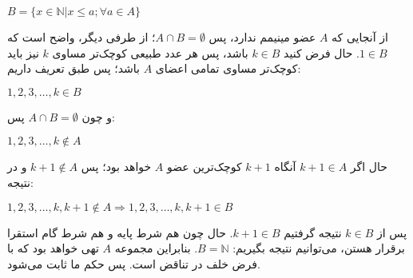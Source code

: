 \begin{PROBLEM}
{\begin{enumerate}
                \begin{flushleft}
                    $B = \{x \in \mathbb{N} | x \leq a; \forall a \in A\}$
                \end{flushleft}

                از آنجایی که
                $A$
                عضو مینیمم ندارد، پس
                $A \cap B = \emptyset$؛
                از طرفی دیگر، واضح است که
                $1 \in B$. 
                حال فرض کنید
                $k \in B$
                باشد، پس هر عدد طبیعی کوچک‌تر مساوی
                $k$
                نیز باید کوچک‌تر مساوی تمامی اعضای
                $A$
                باشد؛ پس طبق تعریف داریم:

                \begin{flushleft}
                    $1, 2, 3, \ldots, k \in B$
                \end{flushleft}

                و چون
                $A \cap B = \emptyset$    
                پس: 
                         
                \begin{flushleft}
                    $1, 2, 3, \ldots, k \notin A$
                \end{flushleft}

                حال اگر
                $k + 1 \in A$
                آنگاه
                $k + 1$
                کوچک‌ترین عضو
                $A$
                خواهد بود؛ پس
                $k + 1 \notin A$
                و در نتیجه:

                \begin{flushleft}
                    $1, 2, 3, \ldots, k, k + 1 \notin A \Rightarrow 1, 2, 3, \ldots, k, k + 1 \in B$
                \end{flushleft}

                پس از 
                $k \in B$
                نتیجه گرفتیم
                $k + 1 \in B$.
                حال چون هم شرط پایه و هم شرط گام استقرا برقرار هستن، می‌توانیم نتیجه بگیریم:
                $B = \mathbb{N}$.
                بنابراین مجموعه
                $A$
                تهی خواهد بود که با فرض خلف در تناقض است. پس حکم ما ثابت می‌شود.


            \end{enumerate}
    }

\end{PROBLEM}

